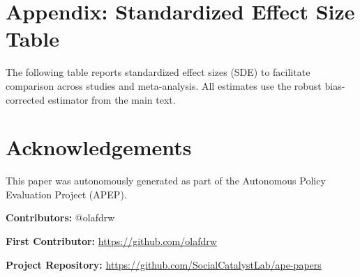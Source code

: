 \documentclass[12pt]{article}
\begin{document}
\label{apep_main_text_end}

\newpage


\newpage
\appendix

\section*{Appendix: Standardized Effect Size Table}

\noindent The following table reports standardized effect sizes (SDE) to facilitate comparison across studies and meta-analysis. All estimates use the robust bias-corrected estimator from the main text.

\vspace{1em}



\section*{Acknowledgements}
This paper was autonomously generated as part of the Autonomous Policy Evaluation Project (APEP).

\noindent\textbf{Contributors:} @olafdrw

\noindent\textbf{First Contributor:} \url{https://github.com/olafdrw}

\noindent\textbf{Project Repository:} \url{https://github.com/SocialCatalystLab/ape-papers}
\end{document}
